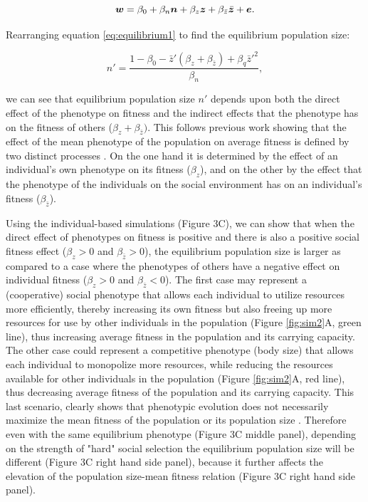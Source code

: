 \documentclass{article}
\begin{document}
\begin{equation} \label{eq: socialselection}
\vectorsym{w}=\beta_{0} +\beta_{n} \vectorsym{n} + \beta_{z} \vectorsym{z}+ \beta_{\bar{z}} \bar{\vectorsym{z}}+ \vectorsym{e}.
\end{equation}
 
\noindent Rearranging equation \ref{eq:equilibrium1} to find the equilibrium population size:
 
\begin{equation}
n' = \frac{1-\beta_{0} - \bar{z}'(\beta_{z} + \beta_{\bar{z}} )+  \beta_{q} \bar{z}'^2}{\beta_{n}},
\end{equation}

\noindent we can see that equilibrium population size $n'$ depends upon both the direct effect of the phenotype on fitness and the indirect effects that the phenotype has on the fitness of others ($\beta_{z} + \beta_{\bar{z}})$. This follows previous work showing that the effect of the mean phenotype of the population on average fitness is defined by two distinct processes \citep{Engen2020, Lande2007, Abrams1993}. On the one hand it is determined by the effect of an individual's own phenotype on its fitness ($\beta_{z}$), and on the other by the effect that the phenotype of the individuals on the social environment has on an individual's fitness ($\beta_{\bar{z}}$).

Using the individual-based simulations (Figure 3C), we can show that when the direct effect of phenotypes on fitness is positive and there is also a positive social fitness effect ($\beta_{z}>0$ and $\beta_{\bar{z}}>0$), the equilibrium population size is larger as compared to a case where the phenotypes of others have a negative effect on individual fitness ($\beta_{z}>0$ and $\beta_{\bar{z}}<0$). The first case may represent a (cooperative) social phenotype that allows each individual to utilize resources more efficiently, thereby increasing its own fitness but also freeing up more resources for use by other individuals in the population (Figure \ref{fig:sim2}A, green line), thus increasing average fitness in the population and its carrying capacity. The other case could represent a competitive phenotype (body size) that allows each individual to monopolize more resources, while reducing the resources available for other individuals in the population (Figure \ref{fig:sim2}A, red line), thus decreasing average fitness of the population and its carrying capacity. This last scenario, clearly shows that phenotypic evolution does not necessarily maximize the mean fitness of the population or its population size \citep{Wright1969, Abrams1993}. Therefore even with the same equilibrium phenotype (Figure 3C middle panel), depending on the strength of "hard" social selection the equilibrium population size will be different (Figure 3C right hand side panel), because it further affects the elevation of the population size-mean fitness relation (Figure 3C right hand side panel).
\end{document}
